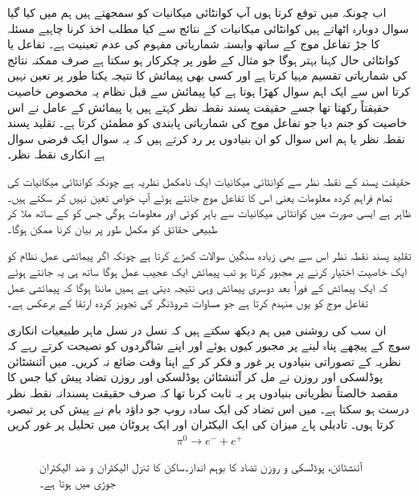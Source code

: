 اب چونکہ میں توقع کرتا ہوں آپ کوانٹائی میکانیات کو سمجھتے ہیں ہم  میں کیا گیا سوال دوبارہ اٹھاتے ہیں کوانٹائی میکانیات کے نتائج سے کیا مطلب  اخذ  کرنا چاہیے مسئلہ کا جڑ تفاعل موج کے ساتھ وابستہ شماریاتی مفہوم کی عدم تعینیت ہے۔ تفاعل  یا کوانٹائی حال کہنا بہتر ہوگا جو مثال کے طور پر چکرکار ہو سکتا ہے صرف ممکنہ نتائج کی شماریاتی تقسیم مہیا کرتا ہے اور کسی بھی پیمائش کا نتیجہ یکتا طور پر تعین نہیں کرتا اس سے ایک اہم سوال کھڑا ہوتا ہے کیا پیمائش سے قبل نظام یہ مخصوص خاصیت حقیقتاً رکھتا تھا جسے حقیقت پسند نقطہ نظر کہتے ہیں یا پیمائش کے عامل نے اس خاصیت کو جنم دیا جو تفاعل موج کی شماریاتی پابندی کو مطمئن کرتا ہے۔ تقلید پسند نقطہ نظر یا ہم اس سوال کو ان بنیادوں پر رد کرتے ہیں کہ یہ سوال ایک فرضی سوال ہے انکاری نقطہ نظر۔

حقیقت پسند کے نقطہ نظر سے کوانٹائی میکانیات ایک نامکمل نظریہ ہے چونکہ کوانٹائی میکانیات کی تمام فراہم کردہ معلومات یعنی اس کا تفاعل موج جانتے ہوئے آپ خواص تعین نہیں کر سکتے ہیں۔ ظاہر ہے ایسی صورت میں کوانٹائی میکانیات سے باہر کوئی اور معلومات ہوگی جس کو  کے ساتھ ملا کر طبیعی حقائق کو مکمل طور پر بیان کرنا ممکن ہوگا۔

تقلید پسند نقطہ نظر اس سے بھی زیادہ سنگین سوالات کھڑے کرتا ہے چونکہ اگر پیمائشی عمل نظام کو ایک خاصیت اختیار کرنے پر مجبور کرتا ہو تب پیمائش ایک عجیب عمل ہوگا ساتھ ہی یہ جانتے ہوئے کہ ایک پیمائش کے فوراً بعد دوسری پیمائش وہی نتیجہ دیتی ہے ہمیں ماننا ہوگا کہ پیمائشی عمل تفاعل موج کو یوں منہدم کرتا ہے جو مساوات شروڈنگر کی تجویز کردہ ارتقا کے برعکس ہے۔

ان سب کی روشنی میں ہم دیکھ سکتے ہیں کہ نسل در نسل ماہر طبیعیات انکاری سوچ کے پیچھے پناہ  لینے پر مجبور کیوں ہوئے اور اپنے شاگردوں کو  نصیحت کرتے رہے کہ نظریہ کے تصوراتی بنیادوں پر غور و فکر کر کے اپنا وقت ضائع نہ کریں۔
میں آئنشٹائن پوڈلسکی اور روزن نے مل کر آئنشٹائن پوڈلسکی اور روزن تضاد پیش کیا جس کا مقصد خالصتاً نظریاتی بنیادوں پر یہ ثابت کرنا تھا کہ صرف حقیقت پسندانہ  نقطہ نظر درست ہو سکتا ہے۔ میں اس تضاد کی ایک سادہ روپ جو داؤد  بام نے پیش کی پر تبصرہ کرتا ہوں۔ تادیلی پاے میزان کی ایک الیکٹران اور ایک پروٹان میں تحلیل پر غور کریں
\begin{align*}
	\pi^0\to e^{-}+e^{+}
\end{align*}
%
\begin{figure}
\centering
{}
\caption{آئنشٹائن، پوڈلسکی و  روزن  تضاد کا بوہم انداز۔ساکن   کا تنزل الیکٹران و  ضد الیکٹران  جوڑی میں ہوتا ہے۔}
\label{شکل_بکھراو_بوہم_تنزل}
\end{figure}

